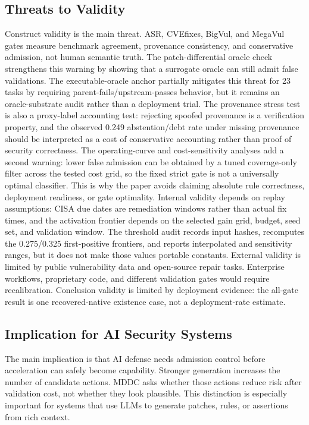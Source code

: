 ﻿\documentclass[lettersize,journal]{IEEEtran}
\begin{document}
\subsection{Threats to Validity}
Construct validity is the main threat. ASR, CVEfixes, BigVul, and MegaVul gates measure benchmark agreement, provenance consistency, and conservative admission, not human semantic truth. The patch-differential oracle check strengthens this warning by showing that a surrogate oracle can still admit false validations. The executable-oracle anchor partially mitigates this threat for 23 tasks by requiring parent-fails/upstream-passes behavior, but it remains an oracle-substrate audit rather than a deployment trial. The provenance stress test is also a proxy-label accounting test: rejecting spoofed provenance is a verification property, and the observed 0.249 abstention/debt rate under missing provenance should be interpreted as a cost of conservative accounting rather than proof of security correctness. The operating-curve and cost-sensitivity analyses add a second warning: lower false admission can be obtained by a tuned coverage-only filter across the tested cost grid, so the fixed strict gate is not a universally optimal classifier. This is why the paper avoids claiming absolute rule correctness, deployment readiness, or gate optimality. Internal validity depends on replay assumptions: CISA due dates are remediation windows rather than actual fix times, and the activation frontier depends on the selected gain grid, budget, seed set, and validation window. The threshold audit records input hashes, recomputes the 0.275/0.325 first-positive frontiers, and reports interpolated and sensitivity ranges, but it does not make those values portable constants. External validity is limited by public vulnerability data and open-source repair tasks. Enterprise workflows, proprietary code, and different validation gates would require recalibration. Conclusion validity is limited by deployment evidence: the all-gate result is one recovered-native existence case, not a deployment-rate estimate.

\subsection{Implication for AI Security Systems}
The main implication is that AI defense needs admission control before acceleration can safely become capability. Stronger generation increases the number of candidate actions. MDDC asks whether those actions reduce risk after validation cost, not whether they look plausible. This distinction is especially important for systems that use LLMs to generate patches, rules, or assertions from rich context.
\end{document}

